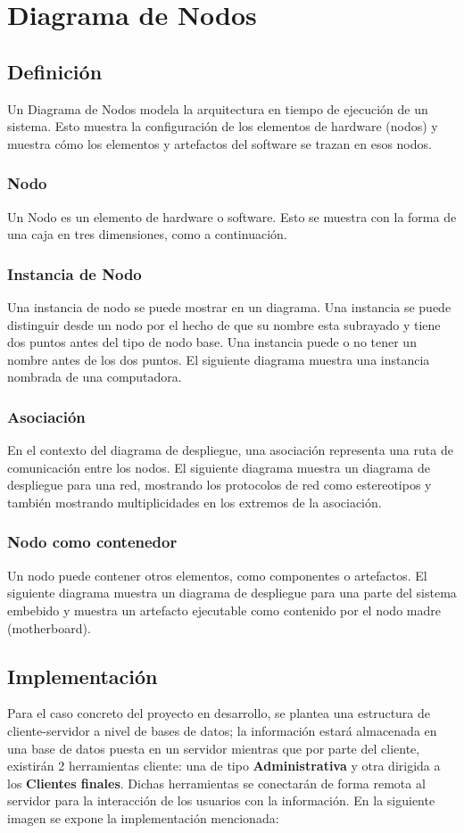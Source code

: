 \chapter{Diagrama de Nodos}
\section{Definición}
Un Diagrama de Nodos modela la arquitectura en tiempo de ejecución de un sistema. Esto muestra la configuración de los elementos de hardware (nodos) y muestra cómo los elementos y artefactos del software se trazan en esos nodos.

\subsection*{Nodo}
Un Nodo es un elemento de hardware o software. Esto se muestra con la forma de una caja en tres dimensiones, como a continuación.

\subsection*{Instancia de Nodo}
Una instancia de nodo se puede mostrar en un diagrama. Una instancia se puede distinguir desde un nodo por el hecho de que su nombre esta subrayado y tiene dos puntos antes del tipo de nodo base. Una instancia puede o no tener un nombre antes de los dos puntos. El siguiente diagrama muestra una instancia nombrada de una computadora.

\subsection*{Asociación}
En el contexto del diagrama de despliegue, una asociación representa una ruta de comunicación entre los nodos. El siguiente diagrama muestra un diagrama de despliegue para una red, mostrando los protocolos de red como estereotipos y también mostrando multiplicidades en los extremos de la asociación.

\subsection*{Nodo como contenedor}
Un nodo puede contener otros elementos, como componentes o artefactos. El siguiente diagrama muestra un diagrama de despliegue para una parte del sistema embebido y muestra un artefacto ejecutable como contenido por el nodo madre (motherboard).

\section{Implementación}
Para el caso concreto del proyecto en desarrollo, se plantea una estructura de cliente-servidor a nivel de bases de datos; la información estará almacenada en una base de datos puesta en un servidor mientras que por  parte del cliente, existirán 2 herramientas cliente: una de tipo \textbf{Administrativa} y otra dirigida a los \textbf{Clientes finales}. Dichas herramientas se conectarán de forma remota al servidor para la interacción de los usuarios con la información. En la siguiente imagen se expone la implementación mencionada:


